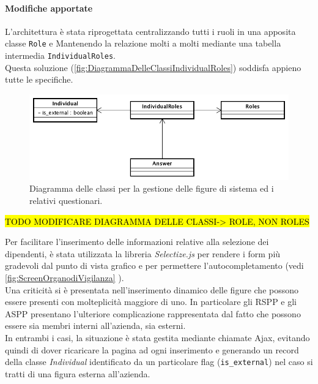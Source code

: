 	\paragraph*{Modifiche apportate}
	L'architettura è stata riprogettata centralizzando tutti i ruoli in una apposita classe \texttt{Role} e Mantenendo la relazione molti a molti mediante una tabella intermedia \texttt{IndividualRoles}. \\
	Questa soluzione (\autoref{fig:DiagrammaDelleClassiIndividualRoles}) soddisfa appieno tutte le specifiche.
		\begin{figure}[H]
			\begin{center}
				\includegraphics[width=14cm]{Pics/UMLClassiFigureDiSistema.png}
				\caption{
					Diagramma delle classi per la gestione delle figure di sistema ed i relativi questionari.}
				\label{fig:DiagrammaDelleClassiIndividualRoles}
			\end{center}
		\end{figure}
	
	\hl{TODO MODIFICARE DIAGRAMMA DELLE CLASSI-> ROLE, NON ROLES}
	
	Per facilitare l'inserimento delle informazioni relative alla selezione dei dipendenti, è stata utilizzata la libreria \textit{Selectize.js} per rendere i form più gradevoli dal punto di vista grafico e per permettere l'autocompletamento (vedi \autoref{fig:ScreenOrganodiVigilanza} ). \\ 
	Una criticità si è presentata nell'inserimento dinamico delle figure che possono essere presenti con molteplicità maggiore di uno. In particolare gli RSPP e gli ASPP presentano l'ulteriore complicazione rappresentata dal fatto che possono essere sia membri interni all'azienda, sia esterni. \\
	In entrambi i casi, la situazione è stata gestita mediante chiamate \gls{Ajax}, evitando quindi di dover ricaricare la pagina ad ogni inserimento e generando un record della classe \textit{Individual}  identificato da un particolare flag (\texttt{is\_external}) nel caso si tratti di una figura esterna all'azienda.\\
	
